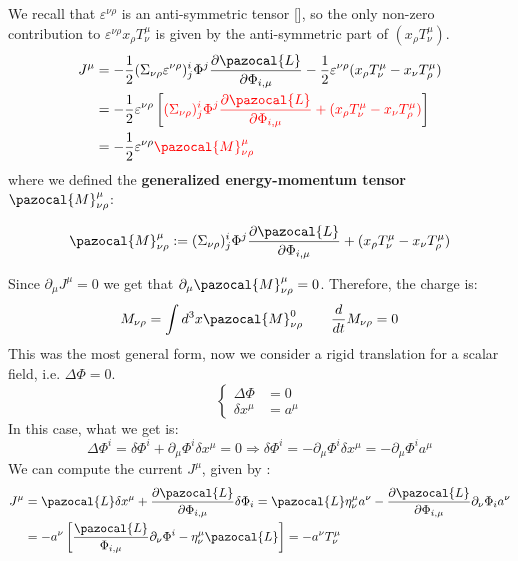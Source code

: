 \documentclass[../main.tex]{subfiles}
\begin{document}
We recall that $\varepsilon^{\nu\rho}$ is an anti-symmetric tensor [], so the only non-zero contribution to $\varepsilon^{\nu\rho}x_{\rho}T^{\mu}_{\nu}$ is given by the anti-symmetric part of $(x_{\rho}T^{\mu}_{\nu})$.
\begin{align*}
    J^{\mu}&=-\frac{1}{2}(\Sigma_{\nu\rho}\varepsilon^{\nu\rho})^i_j\Phi^j\frac{\partial\pazocal{L}}{\partial\Phi_{i,\mu}}-\frac{1}{2}\varepsilon^{\nu\rho}(x_{\rho}T^{\mu}_{\nu}-x_{\nu}T^{\mu}_{\rho})\\
    &=-\frac{1}{2}\varepsilon^{\nu\rho}\left[{\color{red}(\Sigma_{\nu\rho})^i_j\Phi^j\frac{\partial\pazocal{L}}{\partial\Phi_{i,\mu}}+(x_{\rho}T^{\mu}_{\nu}-x_{\nu}T^{\mu}_{\rho})}\right]\\
    &=-\frac{1}{2}\varepsilon^{\nu\rho}{\color{red}\pazocal{M}^{\mu}_{\nu\rho}}
\end{align*}
where we defined the \textbf{generalized energy-momentum tensor} $\pazocal{M}^{\mu}_{\nu\rho}$:
\begin{kaobox}[frametitle=Generalized energy-momentum tensor]
\[
\pazocal{M}^\mu_{\nu\rho}:=(\Sigma_{\nu\rho})^i_j\Phi^j\frac{\partial\pazocal{L}}{\partial\Phi_{i,\mu}}+(x_\rho T^\mu_\nu-x_\nu T^\mu_\rho)
\]
\end{kaobox}
Since $\partial_{\mu}J^{\mu}=0$ we get that $\partial_{\mu}\pazocal{M}^{\mu}_{\nu\rho}=0$. Therefore, the charge is:
\[
M_{\nu\rho}=\int d^3x\pazocal{M}^0_{\nu\rho} \qquad \frac{d}{dt}M_{\nu\rho}=0
\]
This was the most general form, now we consider a rigid translation for a scalar field, i.e. $\Delta\Phi=0$. 
\[
\left\{
\begin{aligned}
\Delta\Phi&=0\\
\delta x^\mu&=a^\mu
\end{aligned}
\right.
\]
In this case, what we get is:
\[
\Delta\Phi^i=\delta\Phi^i+\partial_{\mu}\Phi^i\delta x^{\mu}=0\Rightarrow\delta\Phi^i=-\partial_{\mu}\Phi^i\delta x^{\mu}=-\partial_{\mu}\Phi^ia^{\mu}
\]
We can compute the current $J^{\mu}$, given by :
\begin{align*}
    J^{\mu}&=\pazocal{L}\delta x^{\mu}+\frac{\partial\pazocal{L}}{\partial\Phi_{i,\mu}}\delta\Phi_i=\pazocal{L}\eta^{\mu}_{\nu}a^{\nu}-\frac{\partial\pazocal{L}}{\partial\Phi_{i,\mu}}\partial_{\nu}\Phi_ia^{\nu}\\
    &=-a^{\nu}\left[\frac{\pazocal{L}}{\Phi_{i,\mu}}\partial_{\nu}\Phi^i-\eta^{\mu}_{\nu}\pazocal{L}\right]=-a^{\nu}T^{\mu}_{\nu}
\end{align*}
\end{document}
